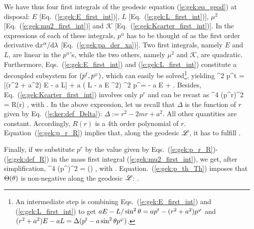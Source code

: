 We have thus four first integrals of the geodesic equation
(\ref{e:gek:eq_geod}) at disposal:
$E$ [Eq.~(\ref{e:gek:E_first_int})], $L$ [Eq.~(\ref{e:gek:L_first_int})],
$\mu^2$ [Eq.~(\ref{e:gek:mu2_first_int})] and $\mathscr{K}$
[Eq.~(\ref{e:gek:Kcarter_first_int})]. In the expressions of each of these integrals,
$p^\alpha$ has to be thought of as the first order derivative $\mathrm{d} x^\alpha/\mathrm{d}\lambda$
[Eq.~(\ref{e:gek:pa_der_xa})].
Two first integrals, namely $E$ and $L$, are linear in the $p^\alpha$'s, while
the two others, namely $\mu^2$ and $\mathscr{K}$, are quadratic.
Furthermore, Eqs.~(\ref{e:gek:E_first_int}) and (\ref{e:gek:L_first_int})
constitute a decoupled subsystem for $(p^t, p^\varphi)$, which can easily be solved\footnote{An
intermediate step is combining  Eqs.~(\ref{e:gek:E_first_int}) and (\ref{e:gek:L_first_int})
to get $a E - L /\sin^2\theta = a p^t - (r^2 + a^2) p^\varphi$
and $(r^2 + a^2) E - a L = \Delta(p^t - a\sin^2\theta p^\varphi)$.},
yielding
\be \label{e:gek:rho2_pt}
    \rho^2 p^t =  [(r^2 + a^2) E - a L] + a ( L - a E \sin^2\th )
\ee
\be  \label{e:gek:rho2_pph}
    \rho^2 p^\ph =  - a E
    + \left[(r^2 + a^2) E - a L\right] .
\ee
Besides, Eq.~(\ref{e:gek:Kcarter_first_int}) involves only $p^r$ and can
be recast as
\be \label{e:gek:p_r_R}
    \rho^4 (p^r)^2 = R(r)  ,
\ee
with
\be \label{e:gek:def_R}
   .
\ee
In the above expression, let us recall that $\Delta$ is the function of $r$
given by Eq.~(\ref{e:ker:def_Delta}): $\Delta := r^2 - 2 m r + a^2$. All other
quantities are constant. Accordingly, $R(r)$ is a 4th order polynomial of $r$.
Equation~(\ref{e:gek:p_r_R}) implies that, along the geodesic $\mathscr{L}$, it has to fulfill
\be \label{e:gek:R_non_neg}
     .
\ee

Finally, if we substitute $p^r$ by the value given by Eqs.~(\ref{e:gek:p_r_R})-(\ref{e:gek:def_R}) in the mass first integral (\ref{e:gek:mu2_first_int}), we get, after simplification,
\be \label{e:gek:p_th_Th}
    \rho^4 (p^\th)^2 = \Theta(\th) ,
\ee
with
\be \label{e:gek:def_Theta}
    .
\ee
Equation.~(\ref{e:gek:p_th_Th}) imposes that $\Theta(\theta)$ is non-negative along
the geodesic $\mathscr{L}$:
\be \label{e:gek:Theta_non_neg}
     .
\ee

